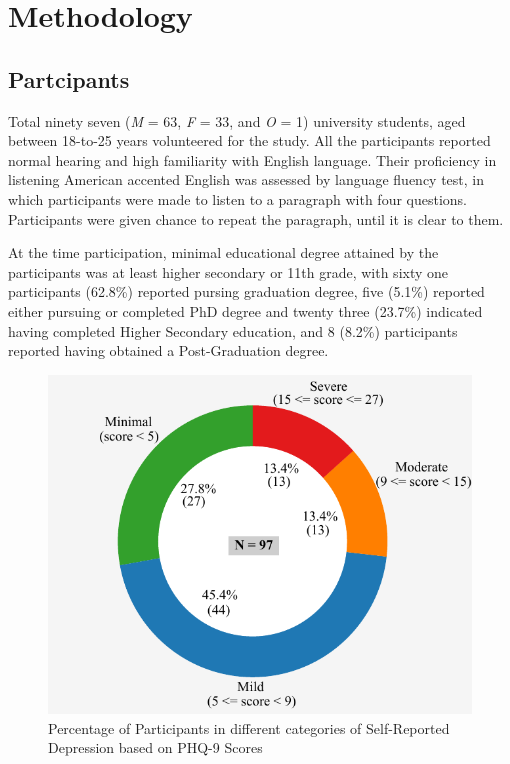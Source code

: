 \documentclass{Interspeech2024}
\begin{document}
\section{Methodology}

\subsection{Partcipants}
Total ninety seven (\textit{M} = 63, \textit{F} = 33, and \textit{O} = 1) university students, aged between 18-to-25 years volunteered for the study. All the participants reported normal hearing and high familiarity with English language. Their proficiency in listening American accented English was assessed by language fluency test, in which participants were made to listen to a paragraph with four questions. Participants were given chance to repeat the paragraph, until it is clear to them. 


At the time participation, minimal educational degree attained by the participants was at least higher secondary or 11th grade, with sixty one participants (62.8\%) reported pursing graduation degree, five (5.1\%) reported either pursuing or completed PhD degree and twenty three (23.7\%) indicated having completed Higher Secondary education, and 8 (8.2\%) participants reported having obtained a Post-Graduation degree. 

\begin{figure}[htbp]
    \centering
    \includegraphics[width=0.8\linewidth]{donut_gray.pdf}
    \caption{Percentage of Participants in different categories of Self-Reported Depression based on PHQ-9 Scores }
    \label{diagram1}
\end{figure}
\end{document}
